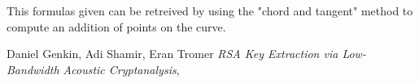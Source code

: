 \documentclass[journal]{IEEEtran}
\begin{document}
This formulas given can be retreived by using the "chord and tangent" method to compute an addition of points on the curve.

\ifCLASSOPTIONcaptionsoff
  \newpage
\fi





%
%
%
\begin{thebibliography}{1}

Daniel Genkin, Adi Shamir, Eran Tromer \emph{RSA Key Extraction via Low-Bandwidth Acoustic Cryptanalysis},

\end{thebibliography}

% 

\end{document}
